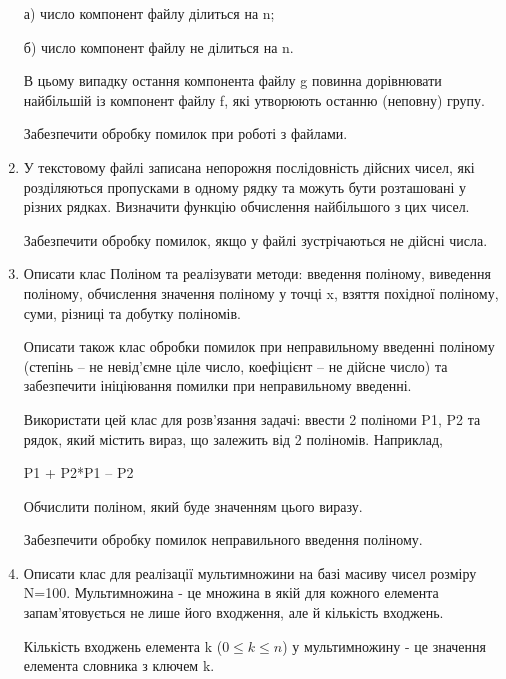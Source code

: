 \documentclass[]{article}
\begin{document}
\begin{enumerate}
а) число компонент файлу ділиться на n;

б) число компонент файлу не ділиться на n.

В цьому випадку остання компонента файлу g повинна дорівнювати
найбільшій із компонент файлу f, які утворюють останню (неповну) групу.

Забезпечити обробку помилок при роботі з файлами.

\item
У текстовому файлі записана непорожня послідовність дійсних чисел, які
розділяються пропусками в одному рядку та можуть бути розташовані у
різних рядках. Визначити функцію обчислення найбільшого з цих чисел.

Забезпечити обробку помилок, якщо у файлі зустрічаються не дійсні числа.

\item

Описати клас Поліном та реалізувати методи: введення поліному, виведення
поліному, обчислення значення поліному у точці x, взяття похідної
поліному, суми, різниці та добутку поліномів.

Описати також клас обробки помилок при неправильному введенні поліному
(степінь -- не невід'ємне ціле число, коефіцієнт -- не дійсне число) та
забезпечити ініціювання помилки при неправильному введенні.

Використати цей клас для розв'язання задачі: ввести 2 поліноми P1, P2 та
рядок, який містить вираз, що залежить від 2 поліномів. Наприклад,

P1 + P2*P1 -- P2

Обчислити поліном, який буде значенням цього виразу.

Забезпечити обробку помилок неправильного введення поліному.
\item

Описати клас для реалізації мультимножини на базі масиву чисел розміру
N=100. Мультимножина - це множина в якій для кожного елемента
запам'ятовується не лише його входження, але й кількість входжень.

Кількість входжень елемента k (\(0 \leq k \leq n\)) у мультимножину - це
значення елемента словника з ключем k.


\end{enumerate}
\end{document}
